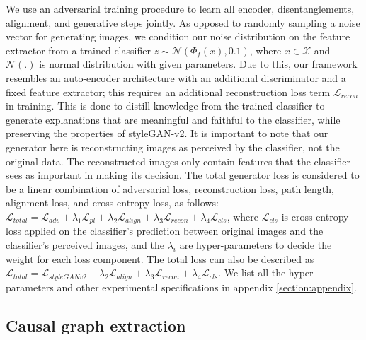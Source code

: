 \documentclass{article}
\newcommand{\ftcom}[2][]{\todo[author=FT, #1]{#2}}
\newcommand{\ftdel}[1]{\textcolor{olive}{$\times$ #1}}
\begin{document}
We use an adversarial training procedure to learn all encoder, disentanglements, alignment, and generative steps jointly. 
As opposed to randomly sampling a noise vector for generating images, we condition our noise distribution on the feature extractor from a trained classifier $z \sim \mathcal{N}(\Phi_f(x), 0.1)$, where $x \in \mathcal{X}$ and $\mathcal{N}(.)$ is normal distribution with given parameters. 
Due to this, our framework resembles an auto-encoder architecture with an additional discriminator and a fixed feature extractor; this requires an additional reconstruction loss term $\mathcal{L}_{recon}$ in training.
This is done to distill knowledge from the trained classifier to generate explanations that are meaningful and faithful to the classifier, while preserving the properties of styleGAN-v2. 
It is important to note that our generator here is reconstructing images as perceived by the classifier, not the original data.
The reconstructed images only contain features that the classifier sees as important in making its decision. 
The total generator loss is considered to be a linear combination of adversarial loss, reconstruction loss, path length, alignment loss, and cross-entropy loss, as follows:
$\mathcal{L}_{total} = \mathcal{L}_{adv} + \lambda_1 \mathcal{L}_{pl} + \lambda_2 \mathcal{L}_{align} + \lambda_3 \mathcal{L}_{recon} + \lambda_4 \mathcal{L}_{cls}$, where $\mathcal{L}_{cls}$ is cross-entropy loss applied on the classifier's prediction between original images and the classifier's perceived images, and the $\lambda_i$ are hyper-parameters to decide the weight for each loss component.
The total loss can also be described as $\mathcal{L}_{total} = \mathcal{L}_{styleGANv2} + \lambda_2 \mathcal{L}_{align} + \lambda_3 \mathcal{L}_{recon} + \lambda_4 \mathcal{L}_{cls}$.
We list all the hyper-parameters and other experimental specifications in appendix \ref{section:appendix}.

\subsection{Causal graph extraction}
\label{subsec:graphs}
\end{document}
